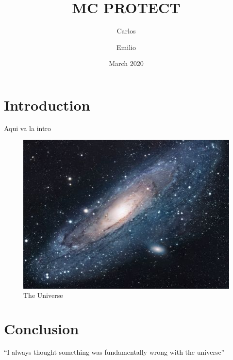 \documentclass{article}
\title{MC PROTECT}
\author{Carlos}
\author{Emilio}
\date{March 2020}
\begin{document}
\maketitle

\section{Introduction}
Aqui va la intro

\begin{figure}[h!]
\centering
\includegraphics[scale=1.7]{universe}
\caption{The Universe}
\label{fig:universe}
\end{figure}

\section{Conclusion}
``I always thought something was fundamentally wrong with the universe''~\citep{adams1995hitchhiker}




\end{document}
